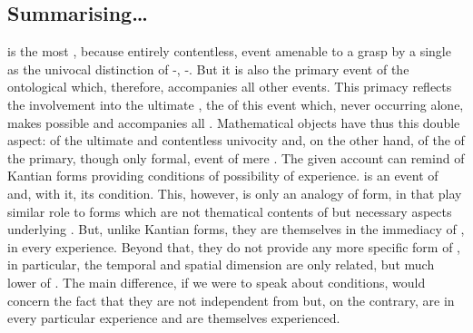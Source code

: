 \subsection{Summarising\ldots}
 is the most , because entirely contentless,
event amenable to a grasp by a single  as the univocal
distinction of -, -. But it is also
the primary event of the ontological  which,
therefore, accompanies all other events. This primacy reflects the involvement
into the ultimate , the  of this event which, never
occurring alone, makes possible and accompanies all
. Mathematical objects have thus this double aspect: of the
ultimate  and contentless univocity and, on the other hand, of the
 of the primary, though only formal, event of mere 
. 
 The given account can remind of Kantian  forms
providing conditions of possibility of experience.   is an event
of  and, with it,  its 
condition.  This, however, is only an analogy of form, in that  play similar role to  forms which are not
thematical contents of  but necessary aspects underlying . But, unlike Kantian forms, they are themselves 
in the immediacy of , in every experience.  Beyond that, they
do not provide any more specific form of , in particular, the
temporal and spatial dimension are only related, but much lower  of
.  The main difference, if we were to speak about  conditions, would concern the fact that they are not independent from
 but, on the contrary, are  in every particular
experience and are themselves experienced.

